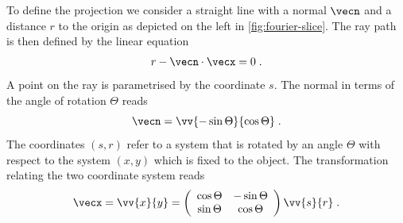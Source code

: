 \documentclass[
twoside,
openright,
titlepage,
numbers=noenddot,
headinclude,
fleqn,
a4paper,
footinclude=true,
cleardoublepage=empty,
abstractoff,
BCOR=5mm,
paper=a4,
fontsize=11pt,
british,ngerman,american,
]{scrreprt}
\begin{document}
To define the projection we consider a straight line with a normal
$\vecn$ and a distance $r$ to the origin as depicted on the left in
\cref{fig:fourier-slice}.  The ray path is then defined by the linear
equation
\begin{equation}
  \label{eq:ray-path}
  r-\vecn\cdot\vecx=0 \;.
\end{equation}
A point on the ray is parametrised by the coordinate $s$. The normal
in terms of the angle of rotation $\Theta$ reads
\begin{equation}
  \label{eq:normal}
  \vecn=\vv{-\sin\Theta}{\cos\Theta} \;.
\end{equation}
The coordinates $(s,r)$ refer to a system that is rotated by an angle
$\Theta$ with respect to the system $(x,y)$ which is fixed to the
object. The transformation relating the two coordinate system reads
\begin{equation}
  \label{eq:xy-to-sr}
  \vecx = \vv{x}{y} = \left(
    \begin{array}{cc}
      \cos\Theta & -\sin\Theta \\ \sin\Theta & \cos\Theta
    \end{array}
  \right )  \vv{s}{r} \;.
\end{equation}
\end{document}
